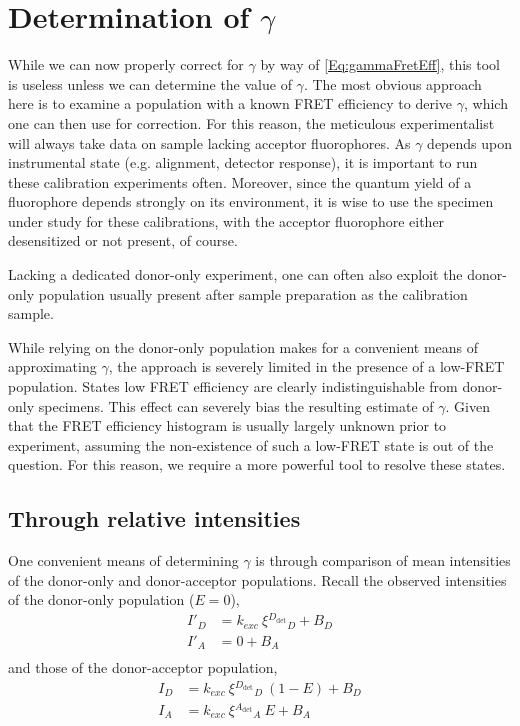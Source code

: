 \documentclass{article}
\newcommand{\dt}[1]{\ensuremath{^{#1_\mathrm{det}}}}   %
\begin{document}
\section{Determination of $\gamma$}
While we can now properly correct for $\gamma$ by way of
\eqref{Eq:gammaFretEff}, this tool is useless unless we can determine
the value of $\gamma$. The most obvious approach here is to examine a
population with a known FRET efficiency to derive $\gamma$, which one
can then use for correction. For this reason, the meticulous
experimentalist will always take data on sample lacking acceptor
fluorophores. As $\gamma$ depends upon instrumental state
(e.g. alignment, detector response), it is important to run these
calibration experiments often. Moreover, since the quantum yield of a
fluorophore depends strongly on its environment, it is wise to use the
specimen under study for these calibrations, with the acceptor
fluorophore either desensitized or not present, of course.

Lacking a dedicated donor-only experiment, one can often also
exploit the donor-only population usually present after sample
preparation as the calibration sample.

While relying on the donor-only population makes for a convenient
means of approximating $\gamma$, the approach is severely limited in
the presence of a low-FRET population. States low FRET efficiency are
clearly indistinguishable from donor-only specimens. This effect can
severely bias the resulting estimate of $\gamma$. Given that the FRET
efficiency histogram is usually largely unknown prior to experiment,
assuming the non-existence of such a low-FRET state is out of the
question. For this reason, we require a more powerful tool to resolve
these states.

\subsection{Through relative intensities}

One convenient means of determining $\gamma$ is through comparison of 
mean intensities of the donor-only and donor-acceptor populations. 
Recall the observed intensities of the donor-only population ($E=0$),
\begin{align*}
I'_D & = k_{exc} ~ \xi\dt{D}_D + B_D \\
I'_A & = 0                    + B_A \\
\end{align*}
and those of the donor-acceptor population,
\begin{align*}
I_D & = k_{exc} ~ \xi\dt{D}_D ~ (1 - E) + B_D \\
I_A & = k_{exc} ~ \xi\dt{A}_A ~ E       + B_A 
\end{align*}
\end{document}
